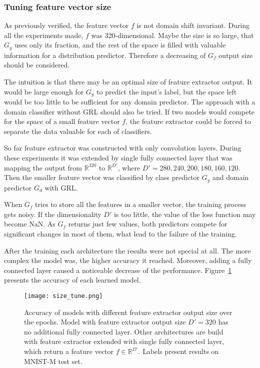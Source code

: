 \documentclass{article}
\begin{document}
\subsubsection{Tuning feature vector size}
As previously verified, the feature vector $f$ is not domain shift invariant. During all the experiments made, $f$ was 320-dimensional. Maybe the size is so large, that $G_{y}$ uses only its fraction, and the rest of the space is filled with valuable information for a distribution predictor. Therefore a decreasing of $G_{f}$ output size should be considered.
\par
The intuition is that there may be an optimal size of feature extractor output. It would be large enough for $G_{y}$ to predict the input's label, but the space left would be too little to be sufficient for any domain predictor. The approach with a domain classifier without GRL should also be tried. If two models would compete for the space of a small feature vector $f$, the feature extractor could be forced to separate the data valuable for each of classifiers.
\par
So far feature extractor was constructed with only convolution layers. During these experiments it was extended by single fully connected layer that was mapping the output from $\mathbb{R}^{320}$ to $\mathbb{R}^{D'}$, where $D' = 280, 240, 200, 180, 160, 120$. Then the smaller feature vector was classified by class predictor $G_{y}$ and domain predictor $G_{d}$ with GRL. 
\par
When $G_{f}$ tries to store all the features in a smaller vector, the training process gets noisy. If the dimensionality $D'$ is too little, the value of the loss function may become NaN. As $G_{f}$ returns just few values, both predictors compete for significant changes in most of them, what lead to the failure of the training.
\par
After the training each architecture the results were not special at all. The more complex the model was, the higher accuracy it reached. Moreover, adding a fully connected layer caused a noticeable decrease of the performance. Figure~\ref{fig:size_tune} presents the accuracy of each learned model. 
\begin{figure}[htb]%
    \centering
    \texttt{[image: size\_tune.png]}%
    \caption{Accuracy of models with different feature extractor output size over the epochs. Model with feature extractor output size $D'=320$ has no additional fully connected layer. Other architectures are build with feature extractor extended with single fully connected layer, which return a feature vector $f \in \mathbb{R}^{D'}$. Labels present results on MNIST-M test set. }
    \label{fig:size_tune}%
\end{figure}
\end{document}
